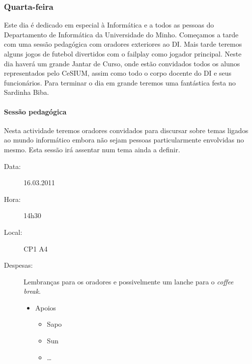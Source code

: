 \subsubsection*{Quarta-feira}
Este dia é dedicado em especial à Informática e a todos as pessoas do Departamento de Informática da Universidade do Minho.
Começamos a tarde com uma sessão pedagógica com oradores exteriores ao DI. Mais tarde teremos alguns jogos de futebol divertidos com o failplay como jogador principal. Neste dia haverá um grande Jantar de Curso, onde estão convidados todos os alunos representados pelo CeSIUM, assim como todo o corpo docente do DI e seus funcionários. Para terminar o dia em grande teremos uma fantástica festa no Sardinha Biba.
%
\paragraph{Sessão pedagógica}
Nesta actividade teremos oradores convidados para discursar sobre temas ligados ao mundo informático embora não sejam pessoas particularmente envolvidas no mesmo. Esta sessão irá assentar num tema ainda a definir.
\begin{description}
\item[Data:] 16.03.2011
\item[Hora:] 14h30
\item[Local:] CP1 A4
\item[Despesas:] Lembranças para os oradores e possivelmente um lanche para o \emph{coffee break}.
\begin{itemize}
\item Apoios
\begin{itemize}
\item Sapo
\item Sun
\item \dots  
\end{itemize}
\end{itemize}
\end{description}
%
